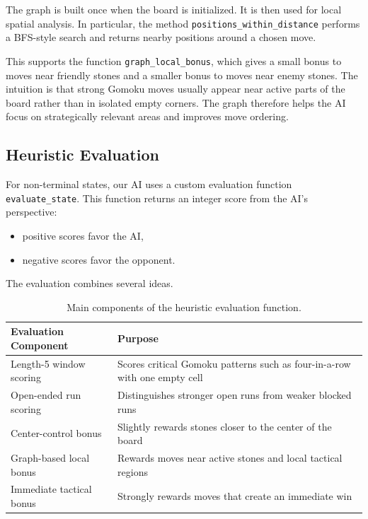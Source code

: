 \documentclass[11pt]{article}
\begin{document}
The graph is built once when the board is initialized. It is then used for local spatial analysis. In particular, the method \texttt{positions\_within\_distance} performs a BFS-style search and returns nearby positions around a chosen move.

This supports the function \texttt{graph\_local\_bonus}, which gives a small bonus to moves near friendly stones and a smaller bonus to moves near enemy stones. The intuition is that strong Gomoku moves usually appear near active parts of the board rather than in isolated empty corners. The graph therefore helps the AI focus on strategically relevant areas and improves move ordering.

\subsection*{Heuristic Evaluation}

For non-terminal states, our AI uses a custom evaluation function \texttt{evaluate\_state}. This function returns an integer score from the AI's perspective:
\begin{itemize}
    \item positive scores favor the AI,
    \item negative scores favor the opponent.
\end{itemize}

The evaluation combines several ideas.

\begin{table}[H]
\centering
\small
\begin{tabularx}{\textwidth}{|P{4.0cm}|Y|}
\hline
\textbf{Evaluation Component} & \textbf{Purpose} \\
\hline
Length-5 window scoring & Scores critical Gomoku patterns such as four-in-a-row with one empty cell \\
\hline
Open-ended run scoring & Distinguishes stronger open runs from weaker blocked runs \\
\hline
Center-control bonus & Slightly rewards stones closer to the center of the board \\
\hline
Graph-based local bonus & Rewards moves near active stones and local tactical regions \\
\hline
Immediate tactical bonus & Strongly rewards moves that create an immediate win \\
\hline
\end{tabularx}
\caption{Main components of the heuristic evaluation function.}
\end{table}
\end{document}

